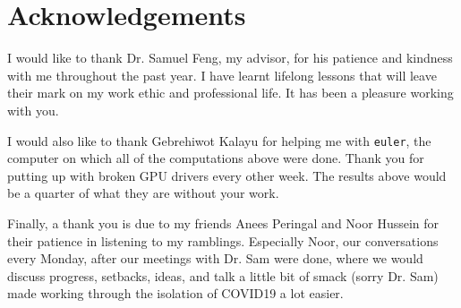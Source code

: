 \documentclass{article}
\begin{document}
\section{Acknowledgements}
I would like to thank Dr. Samuel Feng, my advisor, for his patience and kindness with me throughout the past year. I have learnt lifelong lessons that will leave their mark on my work ethic and professional life. It has been a pleasure working with you.

I would also like to thank Gebrehiwot Kalayu for helping me with \texttt{euler}, the computer on which all of the computations above were done. Thank you for putting up with broken GPU drivers every other week. The results above would be a quarter of what they are without your work.

Finally, a thank you is due to my friends Anees Peringal and Noor Hussein for their patience in listening to my ramblings. Especially Noor, our conversations every Monday, after our meetings with Dr. Sam were done, where we would discuss progress, setbacks, ideas, and talk a little bit of smack (sorry Dr. Sam) made working through the isolation of COVID19 a lot easier.
\typeout{}
\newpage


\end{document}
